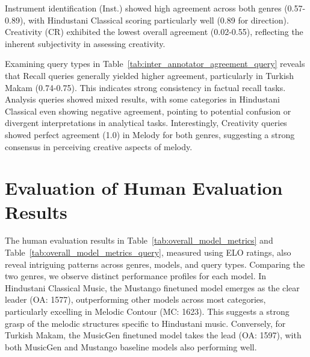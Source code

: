 Instrument identification (Inst.) showed high agreement across both genres (0.57-0.89), with Hindustani Classical scoring particularly well (0.89 for direction). Creativity (CR) exhibited the lowest overall agreement (0.02-0.55), reflecting the inherent subjectivity in assessing creativity.


Examining query types in Table~\ref{tab:inter_annotator_agreement_query} reveals that Recall queries generally yielded higher agreement, particularly in Turkish Makam (0.74-0.75). This indicates strong consistency in factual recall tasks. Analysis queries showed mixed results, with some categories in Hindustani Classical even showing negative agreement, pointing to potential confusion or divergent interpretations in analytical tasks. Interestingly, Creativity queries showed perfect agreement (1.0) in Melody for both genres, suggesting a strong consensus in perceiving creative aspects of melody.

\section{Evaluation of Human Evaluation Results} \label{appendix:human_eval_result}


The human evaluation results in Table~\ref{tab:overall_model_metrics} and Table~\ref{tab:overall_model_metrics_query}, measured using ELO ratings, also reveal intriguing patterns across genres, models, and query types. Comparing the two genres, we observe distinct performance profiles for each model. In Hindustani Classical Music, the Mustango finetuned model emerges as the clear leader (OA: 1577), outperforming other models across most categories, particularly excelling in Melodic Contour (MC: 1623). This suggests a strong grasp of the melodic structures specific to Hindustani music. Conversely, for Turkish Makam, the MusicGen finetuned model takes the lead (OA: 1597), with both MusicGen and Mustango baseline models also performing well.


